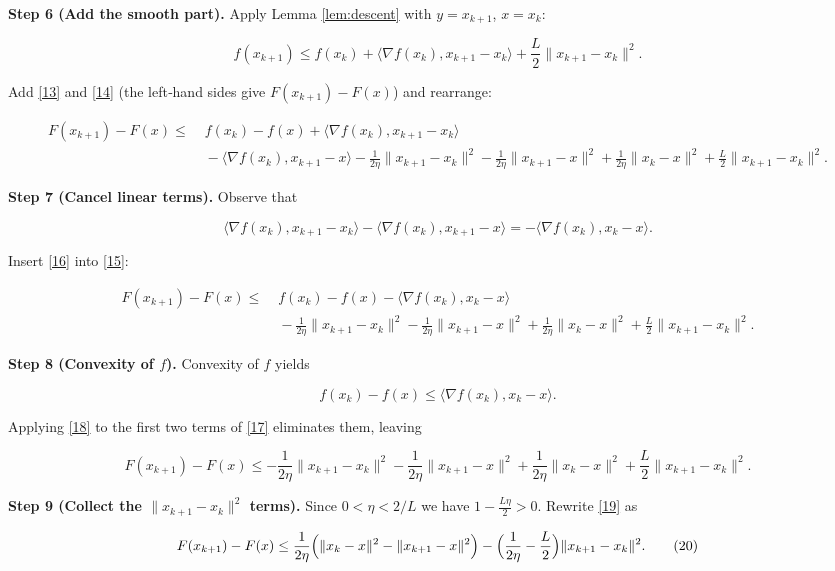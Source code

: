 \documentclass{article}
\begin{document}
\noindent\textbf{Step 6 (Add the smooth part).}  
Apply Lemma \ref{lem:descent} with $y=x_{k+1}$, $x=x_{k}$:

\[
f(x_{k+1})\le f(x_{k})+\langle\nabla f(x_{k}),x_{k+1}-x_{k}\rangle
            +\frac{L}{2}\|x_{k+1}-x_{k}\|^{2}. \tag{14}
\]

Add \eqref{13} and \eqref{14} (the left‑hand sides give $F(x_{k+1})-F(x)$) and rearrange:

\[
\begin{aligned}
F(x_{k+1})-F(x) \le &\; f(x_{k})-f(x) +\langle\nabla f(x_{k}),x_{k+1}-x_{k}\rangle\\
&\;-\langle \nabla f(x_{k}),x_{k+1}-x\rangle
   -\frac{1}{2\eta}\|x_{k+1}-x_{k}\|^{2}
   -\frac{1}{2\eta}\|x_{k+1}-x\|^{2}
   +\frac{1}{2\eta}\|x_{k}-x\|^{2}
   +\frac{L}{2}\|x_{k+1}-x_{k}\|^{2}.
\end{aligned}
\tag{15}
\]

\noindent\textbf{Step 7 (Cancel linear terms).}  
Observe that  

\[
\langle\nabla f(x_{k}),x_{k+1}-x_{k}\rangle-\langle\nabla f(x_{k}),x_{k+1}-x\rangle
= -\langle\nabla f(x_{k}),x_{k}-x\rangle. \tag{16}
\]

Insert \eqref{16} into \eqref{15}:

\[
\begin{aligned}
F(x_{k+1})-F(x) \le &\; f(x_{k})-f(x)-\langle\nabla f(x_{k}),x_{k}-x\rangle\\
&\;-\frac{1}{2\eta}\|x_{k+1}-x_{k}\|^{2}
   -\frac{1}{2\eta}\|x_{k+1}-x\|^{2}
   +\frac{1}{2\eta}\|x_{k}-x\|^{2}
   +\frac{L}{2}\|x_{k+1}-x_{k}\|^{2}.
\end{aligned}
\tag{17}
\]

\noindent\textbf{Step 8 (Convexity of $f$).}  
Convexity of $f$ yields  

\[
f(x_{k})-f(x)\le\langle\nabla f(x_{k}),x_{k}-x\rangle. \tag{18}
\]

Applying \eqref{18} to the first two terms of \eqref{17} eliminates them, leaving

\[
F(x_{k+1})-F(x)\le
-\frac{1}{2\eta}\|x_{k+1}-x_{k}\|^{2}
-\frac{1}{2\eta}\|x_{k+1}-x\|^{2}
+\frac{1}{2\eta}\|x_{k}-x\|^{2}
+\frac{L}{2}\|x_{k+1}-x_{k}\|^{2}. \tag{19}
\]

\noindent\textbf{Step 9 (Collect the $\|x_{k+1}-x_{k}\|^{2}$ terms).}  
Since $0<\eta<2/L$ we have $1-\frac{L\eta}{2}>0$. Rewrite \eqref{19} as  

\[
F(x_{k+1})-F(x)\le
\frac{1}{2\eta}\Bigl(\|x_{k}-x\|^{2}-\|x_{k+1}-x\|^{2}\Bigr)
-\Bigl(\frac{1}{2\eta}-\frac{L}{2}\Bigr)\|x_{k+1}-x_{k}\|^{2}. \tag{20}
\]
\end{document}
